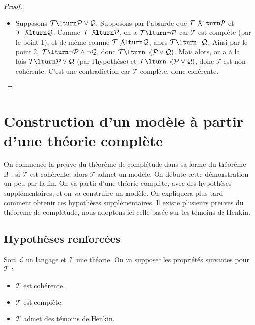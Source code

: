 \documentclass[11pt,class=report,crop=false]{standalone}
\begin{document}
\begin{proof}
\begin{enumerate}
\begin{itemize}
			\item Supposons $\mathcal{T} \lturn \mathcal{P} \lor \mathcal{Q}$. Supposons par l'absurde que $\mathcal{T} \not\lturn \mathcal{P}$ et $\mathcal{T} \not\lturn \mathcal{Q}$.
			Comme $\mathcal{T} \not\lturn \mathcal{P}$, on a $\mathcal{T} \lturn \lnot \mathcal{P}$ car $\mathcal{T}$ est complète (par le point 1), et de même comme $\mathcal{T} \not\lturn \mathcal{Q}$, alors $\mathcal{T} \lturn \lnot \mathcal{Q}$.
			Ainsi par le point 2, $\mathcal{T} \lturn \lnot \mathcal{P} \land \lnot \mathcal{Q}$, donc $\mathcal{T} \lturn \lnot(\mathcal{P} \lor \mathcal{Q})$.
			Mais alors, on a à la fois $\mathcal{T} \lturn \mathcal{P} \lor \mathcal{Q}$ (par l'hypothèse) et $\mathcal{T} \lturn \lnot(\mathcal{P} \lor \mathcal{Q})$, donc $\mathcal{T}$ est non cohérente. C'est une contradiction car $\mathcal{T}$ complète, donc cohérente.
		\end{itemize}
	\end{enumerate}
\end{proof}


\section{Construction d'un modèle à partir d'une théorie complète}
\label{sec:modele}

On commence la preuve du théorème de complétude dans sa forme du théorème B : \og{}si $\mathcal{T}$ est cohérente, alors $\mathcal{T}$ admet un modèle\fg{}. On débute cette démonstration un peu par la fin.
On va partir d'une théorie complète, avec des hypothèses supplémentaires, et on va construire un modèle. On expliquera plus tard comment obtenir ces hypothèses supplémentaires.
Il existe plusieurs preuves du théorème de complétude, nous adoptons ici celle basée sur les témoins de Henkin.

\subsection{Hypothèses renforcées}

Soit $\mathcal{L}$ un langage et $\mathcal{T}$ une théorie. On va supposer les propriétés suivantes pour $\mathcal{T}$ :
\begin{itemize}
	\item[(i)] $\mathcal{T}$ est cohérente.
	\item[(ii)] $\mathcal{T}$ est complète.
	\item[(iii)] $\mathcal{T}$ admet des témoins de Henkin.
\end{itemize}
\end{document}
